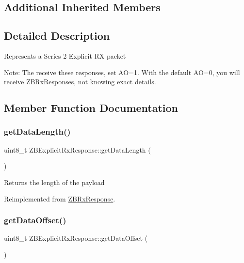 \subsection*{Additional Inherited Members}


\subsection{Detailed Description}
Represents a Series 2 Explicit RX packet

Note\+: The receive these responses, set AO=1. With the default AO=0, you will receive Z\+B\+Rx\+Responses, not knowing exact details. 

\subsection{Member Function Documentation}
\hypertarget{class_z_b_explicit_rx_response_af0f29cd6d76215f50224547ef8201cb7}{}\label{class_z_b_explicit_rx_response_af0f29cd6d76215f50224547ef8201cb7} 
\subsubsection{\texorpdfstring{get\+Data\+Length()}{getDataLength()}}
{\footnotesize\ttfamily uint8\+\_\+t Z\+B\+Explicit\+Rx\+Response\+::get\+Data\+Length (\begin{DoxyParamCaption}{ }\end{DoxyParamCaption})\hspace{0.3cm}{\ttfamily [virtual]}}

Returns the length of the payload 

Reimplemented from \hyperlink{class_z_b_rx_response_a9d2b73060d611bbdd581e0ceb195fd31}{Z\+B\+Rx\+Response}.

\hypertarget{class_z_b_explicit_rx_response_aac859574ace86ba08f6abb9d865fec17}{}\label{class_z_b_explicit_rx_response_aac859574ace86ba08f6abb9d865fec17} 
\subsubsection{\texorpdfstring{get\+Data\+Offset()}{getDataOffset()}}
{\footnotesize\ttfamily uint8\+\_\+t Z\+B\+Explicit\+Rx\+Response\+::get\+Data\+Offset (\begin{DoxyParamCaption}{ }\end{DoxyParamCaption})\hspace{0.3cm}{\ttfamily [virtual]}}

